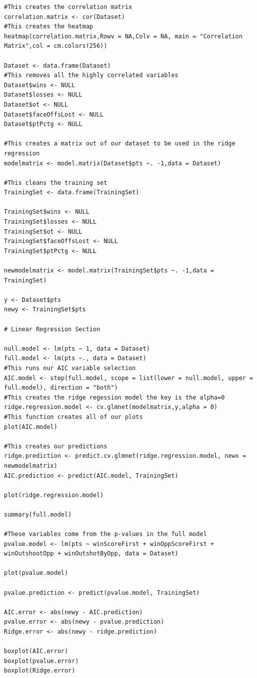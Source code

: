 \begin{verbatim}
#This creates the correlation matrix
correlation.matrix <- cor(Dataset)
#This creates the heatmap
heatmap(correlation.matrix,Rowv = NA,Colv = NA, main = "Correlation Matrix",col = cm.colors(256))

Dataset <- data.frame(Dataset)
#This removes all the highly correlated variables
Dataset$wins <- NULL
Dataset$losses <- NULL
Dataset$ot <- NULL
Dataset$faceOffsLost <- NULL
Dataset$ptPctg <- NULL

#This creates a matrix out of our dataset to be used in the ridge regression 
modelmatrix <- model.matrix(Dataset$pts ~. -1,data = Dataset)

#This cleans the training set
TrainingSet <- data.frame(TrainingSet)

TrainingSet$wins <- NULL
TrainingSet$losses <- NULL
TrainingSet$ot <- NULL
TrainingSet$faceOffsLost <- NULL
TrainingSet$ptPctg <- NULL

newmodelmatrix <- model.matrix(TrainingSet$pts ~. -1,data = TrainingSet)

y <- Dataset$pts
newy <- TrainingSet$pts

# Linear Regression Section

null.model <- lm(pts ~ 1, data = Dataset)
full.model <- lm(pts ~., data = Dataset)
#This runs our AIC variable selection
AIC.model <- step(full.model, scope = list(lower = null.model, upper = full.model), direction = "both")
#This creates the ridge regession model the key is the alpha=0 
ridge.regression.model <- cv.glmnet(modelmatrix,y,alpha = 0)
#This function creates all of our plots
plot(AIC.model)

#This creates our predictions
ridge.prediction <- predict.cv.glmnet(ridge.regression.model, newx = newmodelmatrix)
AIC.prediction <- predict(AIC.model, TrainingSet)

plot(ridge.regression.model)

summary(full.model)

#These variables come from the p-values in the full model
pvalue.model <- lm(pts ~ winScoreFirst + winOppScoreFirst + winOutshootOpp + winOutshotByOpp, data = Dataset)

plot(pvalue.model)

pvalue.prediction <- predict(pvalue.model, TrainingSet)

AIC.error <- abs(newy - AIC.prediction)
pvalue.error <- abs(newy - pvalue.prediction)
Ridge.error <- abs(newy - ridge.prediction)

boxplot(AIC.error)
boxplot(pvalue.error)
boxplot(Ridge.error)


\end{verbatim}
